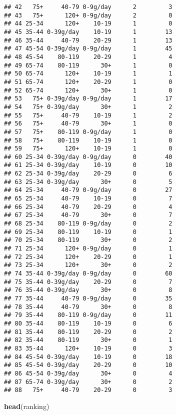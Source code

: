 \documentclass[
]{article}
\newenvironment{Shaded}{\begin{snugshade}}{\end{snugshade}}
\newcommand{\FunctionTok}[1]{\textcolor[rgb]{0.13,0.29,0.53}{\textbf{#1}}}
\newcommand{\NormalTok}[1]{#1}
\begin{document}
\begin{verbatim}
## 42   75+     40-79 0-9g/day      2         3
## 43   75+      120+ 0-9g/day      2         0
## 44 25-34      120+    10-19      1         0
## 45 35-44 0-39g/day    10-19      1        13
## 46 35-44     40-79    20-29      1        13
## 47 45-54 0-39g/day 0-9g/day      1        45
## 48 45-54    80-119    20-29      1         4
## 49 65-74    80-119      30+      1         0
## 50 65-74      120+    10-19      1         1
## 51 65-74      120+    20-29      1         0
## 52 65-74      120+      30+      1         0
## 53   75+ 0-39g/day 0-9g/day      1        17
## 54   75+ 0-39g/day      30+      1         2
## 55   75+     40-79    10-19      1         2
## 56   75+     40-79      30+      1         0
## 57   75+    80-119 0-9g/day      1         0
## 58   75+    80-119    10-19      1         0
## 59   75+      120+    10-19      1         0
## 60 25-34 0-39g/day 0-9g/day      0        40
## 61 25-34 0-39g/day    10-19      0        10
## 62 25-34 0-39g/day    20-29      0         6
## 63 25-34 0-39g/day      30+      0         5
## 64 25-34     40-79 0-9g/day      0        27
## 65 25-34     40-79    10-19      0         7
## 66 25-34     40-79    20-29      0         4
## 67 25-34     40-79      30+      0         7
## 68 25-34    80-119 0-9g/day      0         2
## 69 25-34    80-119    10-19      0         1
## 70 25-34    80-119      30+      0         2
## 71 25-34      120+ 0-9g/day      0         1
## 72 25-34      120+    20-29      0         1
## 73 25-34      120+      30+      0         2
## 74 35-44 0-39g/day 0-9g/day      0        60
## 75 35-44 0-39g/day    20-29      0         7
## 76 35-44 0-39g/day      30+      0         8
## 77 35-44     40-79 0-9g/day      0        35
## 78 35-44     40-79      30+      0         8
## 79 35-44    80-119 0-9g/day      0        11
## 80 35-44    80-119    10-19      0         6
## 81 35-44    80-119    20-29      0         2
## 82 35-44    80-119      30+      0         1
## 83 35-44      120+    10-19      0         3
## 84 45-54 0-39g/day    10-19      0        18
## 85 45-54 0-39g/day    20-29      0        10
## 86 45-54 0-39g/day      30+      0         4
## 87 65-74 0-39g/day      30+      0         2
## 88   75+     40-79    20-29      0         3
\end{verbatim}

\begin{Shaded}
\begin{Highlighting}[]
\FunctionTok{head}\NormalTok{(ranking)}
\end{Highlighting}
\end{Shaded}
\end{document}

